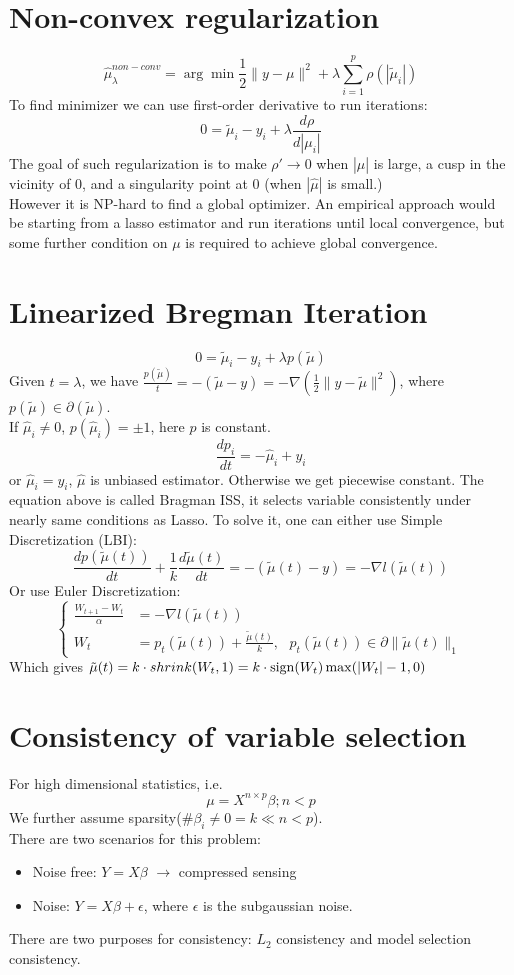 \documentclass[twoside]{article}
\theoremstyle{definition}
\theoremstyle{definition}
\theoremstyle{remark}
\def\sign{{\rm sign}}
\begin{document}
\section{Non-convex regularization}
\begin{equation}
\hat\mu_\lambda^{non-conv} = \arg \min \frac{1}{2} \| y-\mu \|^2 + \lambda \sum_{i=1}^{p} \rho(|\tilde\mu_i|)
\end{equation}
To find minimizer we can use first-order derivative to run iterations: $$ 0 = \tilde\mu_i - y_i + \lambda\frac{d\rho}{d|\mu_i|}$$
The goal of such regularization is to make $\rho' \rightarrow 0$ when $|\hat\mu|$ is large, a cusp in the vicinity of 0, and a singularity point at 0 (when $|\hat\mu|$ is small.)\\
However it is NP-hard to find a global optimizer. An empirical approach would be starting from a lasso estimator and run iterations until local convergence, but some further condition on $\mu$ is required to achieve global convergence.
\section{Linearized Bregman Iteration}
\begin{equation}
0 = \tilde\mu_i - y_i + \lambda p(\tilde\mu)
\end{equation}
Given $t = \lambda$, we have $\frac{p(\tilde\mu)}{t} = -(\tilde\mu-y) = -\nabla(\frac{1}{2}\| y-\tilde\mu \|^2)$, where $p(\tilde\mu) \in \partial(\tilde\mu)$.\\
If $\hat\mu_i\ne0$, $p(\hat\mu_i) = \pm1$, here $p$ is constant. $$\frac{d p_i}{dt} = -\hat\mu_i + y_i$$ or $\hat\mu_i = y_i$, $\hat\mu$ is unbiased estimator. Otherwise we get piecewise constant.
The equation above is called Bragman ISS, it selects variable consistently under nearly same conditions as Lasso. To solve it, one can either use Simple Discretization (LBI):
$$\frac{dp(\tilde\mu(t))}{dt} + \frac{1}{k}\frac{d\tilde\mu(t)}{dt} = -(\tilde\mu(t)-y)=-\nabla l(\tilde\mu(t))$$
Or use Euler Discretization: $$
\begin{cases} \frac{W_{t+1}-W_t}{\alpha} & = -\nabla l(\tilde\mu(t))\\            W_t & = p_t(\tilde\mu(t)) + \frac{\tilde\mu(t)}{k},\ \ \  p_t(\tilde\mu(t)) \in \partial \|\tilde{\mu}(t)\|_1 \end{cases}
$$
Which gives $\tilde\mu(t) = k \cdot shrink(W_t,1)=k\cdot\sign(W_t)\max(|W_t|-1,0)$
\section{Consistency of variable selection}
For high dimensional statistics, i.e. $$ \mu = X^{n\times p} \beta; n<p $$ We further assume sparsity($\# \beta_i \ne 0 = k \ll n < p $).\\
There are two scenarios for this problem: \begin{itemize}
\item{Noise free: $Y=X\beta$ $\rightarrow$ compressed sensing}
\item{Noise: $Y=X\beta+\epsilon$, where $\epsilon$ is the subgaussian noise.}
\end{itemize}
There are two purposes for consistency: $L_2$ consistency and model selection consistency.
\end{document}
